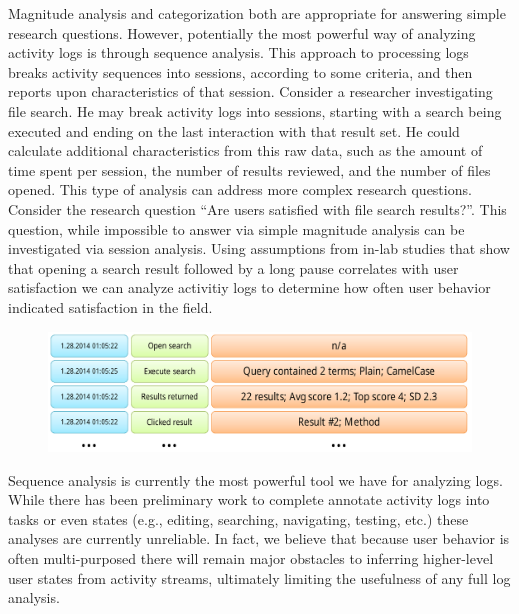 Magnitude analysis and categorization both are appropriate for answering simple research questions. However, potentially the most powerful way of analyzing activity logs is through sequence analysis. 
This approach to processing logs breaks activity sequences into sessions, according to some criteria, and then reports upon characteristics of that session. Consider a researcher investigating file search. He may break activity logs into sessions, starting with a search being executed and ending on the last interaction with that result set. He could calculate additional characteristics from this raw data, such as the amount of time spent per session, the number of results reviewed, and the number of files opened.   
This type of analysis can address more complex research questions. Consider the research question ``Are users satisfied with file search results?''. This question, while impossible to answer via simple magnitude analysis can be investigated via session analysis. Using assumptions from in-lab studies that show that opening a search result followed by a long pause correlates with user satisfaction we can analyze activitiy logs to determine how often user behavior indicated satisfaction in the field. 

\begin{figure}[t]
 \centering
\includegraphics[width=1\columnwidth]{../Graphics/activityLogActual.pdf}
\label{fig:actual}
\end{figure}

Sequence analysis is currently the most powerful tool we have for analyzing logs. While there has been preliminary work to complete annotate activity logs into tasks or even states (e.g., editing, searching, navigating, testing, etc.) these analyses are currently unreliable. In fact, we believe that because user behavior is often multi-purposed there will remain major obstacles to inferring higher-level user states from activity streams, ultimately limiting the usefulness of any full log analysis. 
